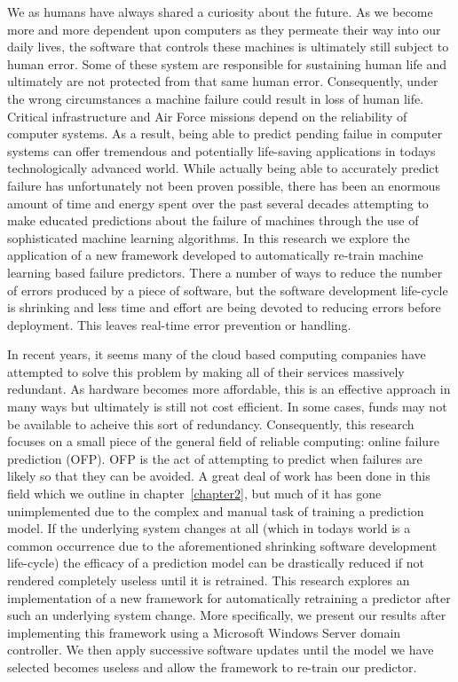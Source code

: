We as humans have always shared a curiosity about the future.  As we become
more and more dependent upon computers as they permeate their way into our
daily lives, the software that controls these machines is ultimately still
subject to human error.  Some of these system are responsible for sustaining
human life and ultimately are not protected from that same human error.
Consequently, under the wrong circumstances a machine failure could result
in loss of human life.  Critical infrastructure and Air Force missions depend
on the reliability of computer systems.  As a result, being able to predict
pending failue in computer systems can offer tremendous and potentially
life-saving applications in todays technologically advanced world.  While
actually being able to accurately predict failure has unfortunately not been
proven possible, there has been an enormous amount of time and energy spent
over the past several decades attempting to make educated predictions about the
failure of machines through the use of sophisticated machine learning
algorithms.  In this research we explore the application of a new framework
developed to automatically re-train machine learning based failure predictors.
There a number of ways to reduce the number of errors produced by a piece of
software, but the software development life-cycle is shrinking and less time
and effort are being devoted to reducing errors before deployment.  This leaves
real-time error prevention or handling.  

In recent years, it seems many of the cloud based computing companies have
attempted to solve this problem by making all of their services massively
redundant.  As hardware becomes more affordable, this is an effective approach
in many ways but ultimately is still not cost efficient.  In some cases, funds
may not be available to acheive this sort of redundancy.  Consequently, this
research focuses on a small piece of the general field of reliable computing:
online failure prediction (OFP).  OFP is the act of attempting to predict when
failures are likely so that they can be avoided.  A great deal of work has been
done in this field which we outline in chapter~\ref{chapter2}, but much of it
has gone unimplemented due to the complex and manual task of training a
prediction model.  If the underlying system changes at all (which in todays
world is a common occurrence due to the aforementioned shrinking software
development life-cycle) the efficacy of a prediction model can be drastically
reduced if not rendered completely useless until it is retrained.  This
research explores an implementation of a new framework for automatically
retraining a predictor after such an underlying system change.  More
specifically, we present our results after implementing this framework using a
Microsoft Windows Server domain controller.  We then apply successive software
updates until the model we have selected becomes useless and allow the
framework to re-train our predictor.


